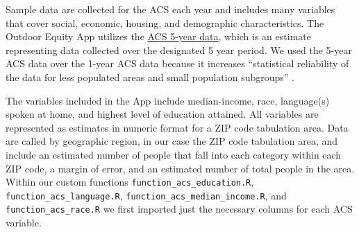 \documentclass[
]{book}
\begin{document}
Sample data are collected for the ACS each year and includes many variables that cover social, economic, housing, and demographic characteristics. The Outdoor Equity App utilizes the \href{https://www.census.gov/data/developers/data-sets/acs-5year.html}{ACS 5-year data}, which is an estimate representing data collected over the designated 5 year period. We used the 5-year ACS data over the 1-year ACS data because it increases ``statistical reliability of the data for less populated areas and small population subgroups'' \citep{ACS}.

The variables included in the App include median-income, race, language(s) spoken at home, and highest level of education attained. All variables are represented as estimates in numeric format for a ZIP code tabulation area. Data are called by geographic region, in our case the ZIP code tabulation area, and include an estimated number of people that fall into each category within each ZIP code, a margin of error, and an estimated number of total people in the area. Within our custom functions \texttt{function\_acs\_education.R}, \texttt{function\_acs\_language.R}, \texttt{function\_acs\_median\_income.R}, and \texttt{function\_acs\_race.R} we first imported just the necessary columns for each ACS variable.
\end{document}
